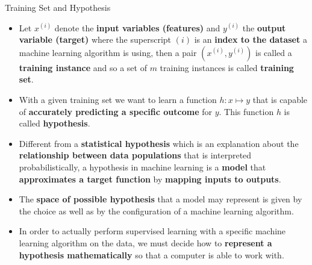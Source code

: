 \documentclass[main.tex]{subfiles}
\begin{document}
    \begin{frame}{Training Set and Hypothesis}
        \begin{itemize}
            \item Let $x^{(i)}$ denote the \textbf{input variables (features)} and $y^{(i)}$ the \textbf{output variable (target)} where the superscript $(i)$ is an \textbf{index to the dataset} a machine learning algorithm is using, then a pair $(x^{(i)}, y^{(i)})$ is called a \textbf{training instance} and so a set of $m$ training instances is called \textbf{training set}.
            \item With a given training set we want to learn a function $h:x \mapsto y$ that is capable of \textbf{accurately predicting a specific outcome} for $y$. This function $h$ is called \textbf{hypothesis}.
            \item Different from a \textbf{statistical hypothesis} which is an explanation about the \textbf{relationship between data populations} that is interpreted probabilistically, a hypothesis in machine learning is a \textbf{model} that \textbf{approximates a target function} by \textbf{mapping inputs to outputs}. 
            \item The \textbf{space of possible hypothesis} that a model may represent is given by the choice as well as by the configuration of a machine learning algorithm.
            \item In order to actually perform supervised learning with a specific machine learning algorithm on the data, we must decide how to \textbf{represent a hypothesis mathematically}  so that a computer is able to work with.
        \end{itemize}
    \end{frame}
\end{document}
